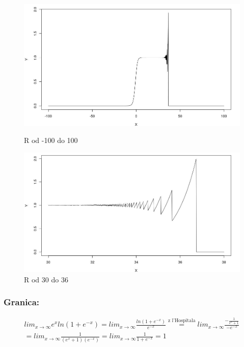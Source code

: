 \documentclass[12pt]{article}
\begin{document}
\begin{figure}[!htb]
  \includegraphics[width=\linewidth]{zad2_plot_2_2.jpg}
  \caption{R od -100 do 100}\label{fig:figure3}
\endminipage\hfill
{}
  \includegraphics[width=\linewidth]{zad2_plot_3_2.jpg}
  \caption{R od 30 do 36}\label{fig:figure4}
\endminipage
\end{figure}

\subsubsection*{Granica:}
\begin{align*}
lim_{x \to \infty} e^x ln(1+e^{-x}) = lim_{x \to \infty} \frac{ln(1+e^{-x})}{e^{-x}} \stackrel{\text{z l’Hospitala}}{=} lim_{x \to \infty} \frac{-\frac{1}{e^x + 1}}{-e^{-x}} \\
= lim_{x \to \infty} \frac{1}{(e^x + 1)(e^{-x})} = lim_{x \to \infty} \frac{1}{1 + e^{-x}} = 1 
\end{align*}
\end{document}
